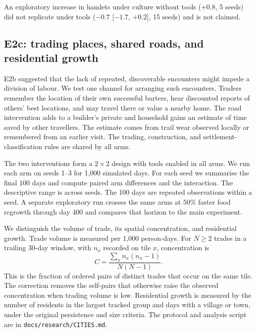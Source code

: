 \documentclass[11pt]{article}
\theoremstyle{definition}
\newcommand{\1}{\mathbf{1}}
\begin{document}
An exploratory increase in hamlets under culture without tools ($+0.8$, 5 seeds) did not replicate under tools ($-0.7$ {\scriptsize[$-1.7$, $+0.2$]}, 15 seeds) and is not claimed.

\subsection{E2c: trading places, shared roads, and residential growth}
\label{sec:cities}
E2b suggested that the lack of repeated, discoverable encounters might impede a division of labour. We test one channel for arranging such encounters. Traders remember the location of their own successful barters, hear discounted reports of others' best locations, and may travel there or value a nearby home. The road intervention adds to a builder's private and household gains an estimate of time saved by other travellers. The estimate comes from trail wear observed locally or remembered from an earlier visit. The trading, construction, and settlement-classification rules are shared by all arms.

The two interventions form a $2\times2$ design with tools enabled in all arms. We run each arm on seeds 1--3 for 1,000 simulated days. For each seed we summarise the final 100 days and compute paired arm differences and the interaction. The descriptive range is across seeds. The 100 days are repeated observations within a seed. A separate exploratory run crosses the same arms at 50\% faster food regrowth through day 400 and compares that horizon to the main experiment.

We distinguish the volume of trade, its spatial concentration, and residential growth. Trade volume is measured per 1,000 person-days. For $N\ge2$ trades in a trailing 30-day window, with $n_x$ recorded on tile $x$, concentration is
\[
  C = \frac{\sum_x n_x(n_x-1)}{N(N-1)}.
\]
This is the fraction of ordered pairs of distinct trades that occur on the same tile. The correction removes the self-pairs that otherwise raise the observed concentration when trading volume is low. Residential growth is measured by the number of residents in the largest tracked group and days with a village or town, under the original persistence and size criteria. The protocol and analysis script are in \texttt{docs/research/CITIES.md}.
\end{document}
